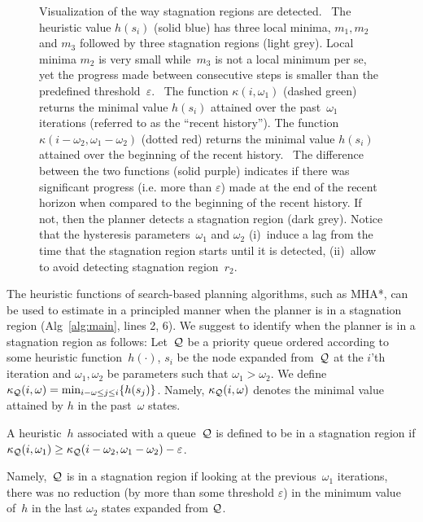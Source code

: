 \documentclass[conference]{IEEEtran}
\begin{document}
\begin{figure}[t]
{  }
  \vspace{-1mm}
  \caption{%
    Visualization of the way stagnation regions are detected.   
	~The heuristic value $h(s_i)$ (solid blue) has three local minima, $m_1, m_2$ and $m_3$ followed by three stagnation regions (light grey). Local minima $m_2$ is very small while~$m_3$ is not a local minimum per se, yet the progress made between consecutive steps is smaller than the predefined threshold~$\varepsilon$.
    ~The function $\kappa(i,\omega_1)$ (dashed green) returns the minimal value $h(s_i)$ attained over the past~$\omega_1$ iterations (referred to  as the ``recent history'').
    The function $\kappa(i-\omega_2,\omega_1-\omega_2)$ (dotted red) returns the minimal value $h(s_i)$ attained over the beginning of the recent history.
    ~The difference between the two functions (solid purple) indicates if there was significant progress (i.e. more than $\varepsilon$) made at the end of the recent horizon when compared to the beginning of the recent history. 
    If not, then the planner detects a stagnation region (dark grey).
		Notice that the hysteresis parameters~$\omega_1$ and $\omega_2$ 
		(i)~induce a lag from the time that the stagnation region starts until it is detected,
		(ii)~allow to avoid detecting stagnation region~$r_2$.  
		}%

  \label{fig:filmstrip-local-min}%

  \vspace{-4.5mm}

\end{figure}


The heuristic functions of search-based planning algorithms, such as MHA*, can be used to estimate in a principled manner when the planner is in a stagnation region (Alg~\ref{alg:main}, lines 2, 6). 
%
We suggest to identify when the planner is in a stagnation region as follows:
Let~$\mathcal{Q}$ be a priority queue 
ordered according to some heuristic function~$h(\cdot)$,
$s_i$ be the node expanded from~$\mathcal{Q}$ at the $i$'th iteration and $\omega_1, \omega_2$ be parameters such that $\omega_1 > \omega_2$.
%
We define 
$\kappa_{\mathcal{Q}}(i, \omega) = \min_{i-\omega \leq j \leq i} \{ h(s_j)\}$.
Namely, $\kappa_{\mathcal{Q}}(i, \omega)$ denotes the minimal value attained by $h$ in the past~$\omega$ states. 
%
\begin{definition}
A heuristic~$h$ associated with a queue~$\mathcal{Q}$ is defined to be in a stagnation region if 
$\kappa_{\mathcal{Q}}(i, \omega_1) \geq \kappa_{\mathcal{Q}}(i - \omega_2, \omega_1 - \omega_2) - \varepsilon$.
\end{definition}
\noindent Namely,~$\mathcal{Q}$ is in a stagnation region if looking at the previous~$\omega_1$ iterations, 
there was no reduction 
(by more than some threshold $\varepsilon$) 
in the minimum value of~$h$ 
in the last $\omega_2$ states expanded from $\mathcal{Q}$.
\end{document}
